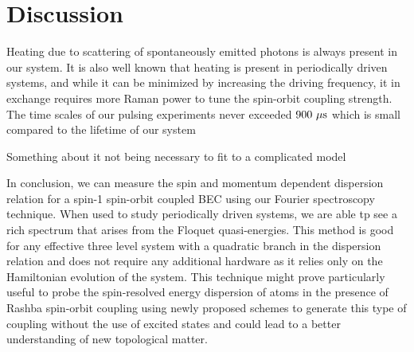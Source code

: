 \section{Discussion}


Heating due to scattering of spontaneously emitted photons is always present in our system. It is also well known that heating is present in periodically driven systems, and while it can be minimized by increasing the driving frequency, it in exchange requires more Raman power to tune the spin-orbit coupling strength. The time scales of our pulsing experiments never exceeded $900{\ \mu{\rm s}}$ which is small compared to the lifetime of our system

Something about it not being necessary to fit to a complicated model 

In conclusion, we can measure the spin and momentum dependent dispersion relation for a spin-1 spin-orbit coupled BEC using our Fourier spectroscopy technique. When used to study periodically driven systems, we are able tp see a rich spectrum that arises from the Floquet quasi-energies. This method is good for any effective three level system with a quadratic branch in the dispersion relation and does not require any additional hardware as it relies only on the Hamiltonian evolution of the system.  This technique might prove particularly useful to probe the spin-resolved energy dispersion of atoms in the presence of Rashba spin-orbit coupling using newly proposed schemes to generate this type of coupling without the use of excited states and could lead to a better understanding of new topological matter. 
